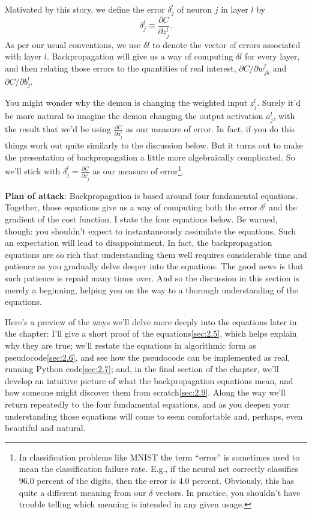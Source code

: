 \documentclass[a4paper,twoside,10pt]{book}
\begin{document}
Motivated by this story, we define the error $\delta^l_j$ of neuron $j$ in layer $l$ by
\begin{equation}
	\delta^l_j\equiv\frac{\partial{}C}{\partial{}z^l_j}.\label{eq:29}
\end{equation}
As per our usual conventions, we use $\delta{}l$ to denote the vector of errors associated with layer $l$. Backpropagation will give us a way of computing $\delta{}l$ for every layer, and then relating those errors to the quantities of real interest, $\partial{}C/\partial{}w^l_{jk}$ and $\partial{}C/\partial{}b^l_j$.

You might wonder why the demon is changing the weighted input $z^l_j$. Surely it'd be more natural to imagine the demon changing the output activation $a^l_j$, with the result that we'd be using $\frac{\partial{}C}{\partial{}a^l_j}$ as our measure of error. In fact, if you do this things work out quite similarly to the discussion below. But it turns out to make the presentation of backpropagation a little more algebraically complicated. So we'll stick with $\delta^l_j=\frac{\partial{}C}{\partial{}z^l_j}$ as our measure of error\footnote{In classification problems like MNIST the term ``error'' is sometimes used to mean the classification failure rate. E.g., if the neural net correctly classifies 96.0 percent of the digits, then the error is 4.0 percent. Obviously, this has quite a different meaning from our $\delta$ vectors. In practice, you shouldn't have trouble telling which meaning is intended in any given usage.}.

\textbf{Plan of attack}: Backpropagation is based around four fundamental equations. Together, those equations give us a way of computing both the error $\delta{}^l$ and the gradient of the cost function. I state the four equations below. Be warned, though: you shouldn't expect to instantaneously assimilate the equations. Such an expectation will lead to disappointment. In fact, the backpropagation equations are so rich that understanding them well requires considerable time and patience as you gradually delve deeper into the equations. The good news is that such patience is repaid many times over. And so the discussion in this section is merely a beginning, helping you on the way to a thorough understanding of the equations.

Here's a preview of the ways we'll delve more deeply into the equations later in the chapter: I'll give a short proof of the equations\ref{sec:2.5}, which helps explain why they are true; we'll restate the equations in algorithmic form as pseudocode\ref{sec:2.6}, and see how the pseudocode can be implemented as real, running Python code\ref{sec:2.7}; and, in the final section of the chapter, we'll develop an intuitive picture of what the backpropagation equations mean, and how someone might discover them from scratch\ref{sec:2.9}. Along the way we'll return repeatedly to the four fundamental equations, and as you deepen your understanding those equations will come to seem comfortable and, perhaps, even beautiful and natural.
\end{document}
